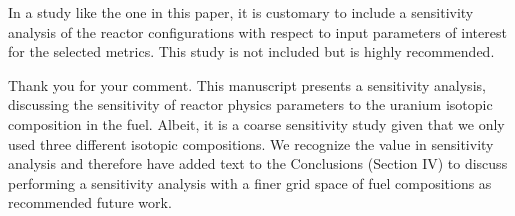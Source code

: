 \documentclass[answers,11pt]{exam}
\begin{document}
\begin{questions}
        \question In a study like the one in this paper, it is customary to include a
        sensitivity analysis of the reactor configurations with respect to input
        parameters of interest for the selected metrics. This study is not included but
        is highly recommended.
        \begin{solution}
                Thank you for your comment. This 
                manuscript presents a sensitivity analysis, 
                discussing the sensitivity of reactor 
                physics parameters to the uranium isotopic 
                composition in the fuel. Albeit, it is a 
                coarse sensitivity study given that we only 
                used three different isotopic compositions. 
                We recognize the value in
                sensitivity analysis and therefore have 
                added text to the Conclusions (Section IV)
                to discuss performing a sensitivity 
                analysis with a finer grid space of fuel 
                compositions as recommended future work.

        \end{solution} 
\end{questions}


\end{document}
